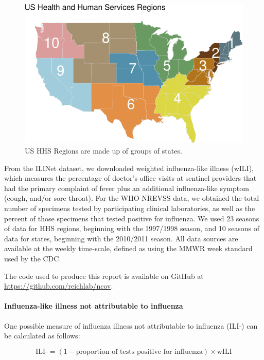 \documentclass[]{article}
\let\oldparagraph\paragraph
\renewcommand{\paragraph}[1]{\oldparagraph{#1}\mbox{}}
\begin{document}
\begin{figure}
\centering
\includegraphics{ili-labtest-report_files/figure-latex/hhs-regions-map-1.pdf}
\caption{\label{fig:hhs-regions-map}US HHS Regions are made up of groups
of states.}
\end{figure}

From the ILINet dataset, we downloaded weighted influenza-like illness
(wILI), which measures the percentage of doctor's office visits at
sentinel providers that had the primary complaint of fever plus an
additional influenza-like symptom (cough, and/or sore throat). For the
WHO-NREVSS data, we obtained the total number of specimens tested by
participating clinical laboratories, as well as the percent of those
specimens that tested positive for influenza. We used 23 seasons of data
for HHS regions, beginning with the 1997/1998 season, and 10 seasons of
data for states, beginning with the 2010/2011 season. All data sources
are available at the weekly time-scale, defined as using the MMWR week
standard used by the CDC.

The code used to produce this report is available on GitHub at
\url{https://github.com/reichlab/ncov}.

\hypertarget{influenza-like-illness-not-attributable-to-influenza}{%
\paragraph{Influenza-like illness not attributable to
influenza}\label{influenza-like-illness-not-attributable-to-influenza}}

One possible measure of influenza illness not attributable to influenza
(ILI-) can be calculated as follows:

\[\text{ILI-} = (1 - \text{proportion of tests positive for influenza}) \times \text{wILI}\]
\end{document}
